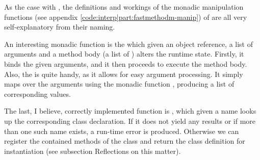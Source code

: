 As the case with , the definitions and workings of the monadic
manipulation functions (see appendix \ref{code:interp|part:fastmethodm-manip})
of  are all very self-explanatory from their naming.

An interesting monadic function is the  which given an
object reference, a list of arguments and a method body (a list of
) alters the runtime state. Firstly, it binds the given arguments,
and it then proceeds to execute the method body. Also, the 
is quite handy, as it allows for easy argument processing. It simply maps over
the arguments using the monadic function , producing a list of
corresponding values.

The last, I believe, correctly implemented function is ,
which given a name looks up the corresponding class declaration. If it does
not yield any results or if more than one such name exists, a run-time error
is produced. Otherwise we can register the contained methods of the class and
return the class definition for instantiation (see subsection Reflections on
this matter).
